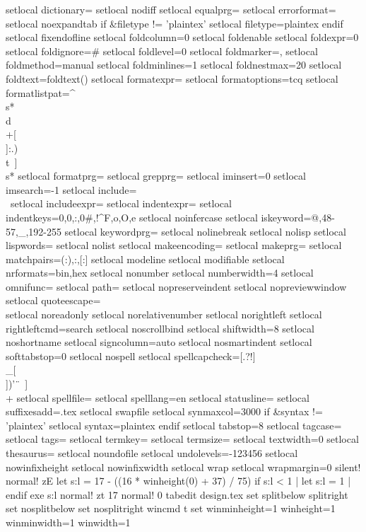 {{{{setlocal dictionary=
setlocal nodiff
setlocal equalprg=
setlocal errorformat=
setlocal noexpandtab
if &filetype != 'plaintex'
setlocal filetype=plaintex
endif
setlocal fixendofline
setlocal foldcolumn=0
setlocal foldenable
setlocal foldexpr=0
setlocal foldignore=#
setlocal foldlevel=0
setlocal foldmarker={{{,}}}
setlocal foldmethod=manual
setlocal foldminlines=1
setlocal foldnestmax=20
setlocal foldtext=foldtext()
setlocal formatexpr=
setlocal formatoptions=tcq
setlocal formatlistpat=^\\s*\\d\\+[\\]:.)}\\t\ ]\\s*
setlocal formatprg=
setlocal grepprg=
setlocal iminsert=0
setlocal imsearch=-1
setlocal include=\\\
setlocal includeexpr=
setlocal indentexpr=
setlocal indentkeys=0{,0},:,0#,!^F,o,O,e
setlocal noinfercase
setlocal iskeyword=@,48-57,_,192-255
setlocal keywordprg=
setlocal nolinebreak
setlocal nolisp
setlocal lispwords=
setlocal nolist
setlocal makeencoding=
setlocal makeprg=
setlocal matchpairs=(:),{:},[:]
setlocal modeline
setlocal modifiable
setlocal nrformats=bin,hex
setlocal nonumber
setlocal numberwidth=4
setlocal omnifunc=
setlocal path=
setlocal nopreserveindent
setlocal nopreviewwindow
setlocal quoteescape=\\
setlocal noreadonly
setlocal norelativenumber
setlocal norightleft
setlocal rightleftcmd=search
setlocal noscrollbind
setlocal shiftwidth=8
setlocal noshortname
setlocal signcolumn=auto
setlocal nosmartindent
setlocal softtabstop=0
setlocal nospell
setlocal spellcapcheck=[.?!]\\_[\\])'\"\	\ ]\\+
setlocal spellfile=
setlocal spelllang=en
setlocal statusline=
setlocal suffixesadd=.tex
setlocal swapfile
setlocal synmaxcol=3000
if &syntax != 'plaintex'
setlocal syntax=plaintex
endif
setlocal tabstop=8
setlocal tagcase=
setlocal tags=
setlocal termkey=
setlocal termsize=
setlocal textwidth=0
setlocal thesaurus=
setlocal noundofile
setlocal undolevels=-123456
setlocal nowinfixheight
setlocal nowinfixwidth
setlocal wrap
setlocal wrapmargin=0
silent! normal! zE
let s:l = 17 - ((16 * winheight(0) + 37) / 75)
if s:l < 1 | let s:l = 1 | endif
exe s:l
normal! zt
17
normal! 0
tabedit design.tex
set splitbelow splitright
set nosplitbelow
set nosplitright
wincmd t
set winminheight=1 winheight=1 winminwidth=1 winwidth=1
}}}
